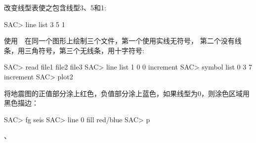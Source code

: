 改变线型表使之包含线型3、5和1:
\begin{SACCode}
SAC> line list 3 5 1
\end{SACCode}

使用~~在同一个图形上绘制三个文件，第一个使用实线无符号，
第二个没有线条，用三角符号，第三个无线条，用十字符号:
\begin{SACCode}
SAC> read file1 file2 file3
SAC> line list 1 0 0 increment
SAC> symbol list 0 3 7 increment
SAC> plot2
\end{SACCode}

将地震图的正值部分涂上红色，负值部分涂上蓝色，如果线型为0，则涂色区域用黑色描边：
\begin{SACCode}
SAC> fg seis
SAC> line 0 fill red/blue
SAC> p
\end{SACCode}

、
